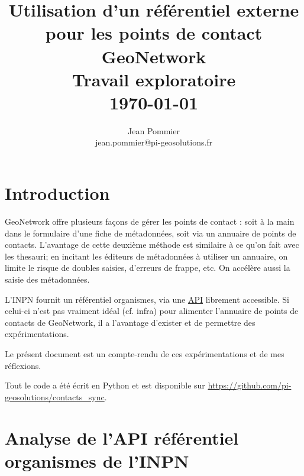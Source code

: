 \documentclass[11pt, a4paper, oneside]{book}
\newcommand{\gn}{GeoNetwork\xspace}
\begin{document}
\author{Jean Pommier \\ \small{jean.pommier@pi-geosolutions.fr}\vspace{2em}}
\title{Utilisation d'un référentiel externe \\ pour les points de contact GeoNetwork \\
\vspace{1em}
\large Travail exploratoire\\
\vspace{1em}
\large \today}
\date{}

\maketitle

\thispagestyle{fancy}

\vspace*{3cm}
\section*{Introduction}
\gn offre plusieurs façons de gérer les points de contact : soit à la main dans le formulaire d'une fiche de métadonnées, soit via un annuaire de points de contacts. L'avantage de cette deuxième méthode est similaire à ce qu'on fait avec les thesauri; en incitant les éditeurs de métadonnées à utiliser un annuaire, on limite le risque de doubles saisies, d'erreurs de frappe, etc. On accélère aussi la saisie des métadonnées.

L'INPN fournit un référentiel organismes, via une \href{https://odata-sinp.mnhn.fr/organizations}{API} librement accessible. Si celui-ci n'est pas vraiment idéal (cf. infra) pour alimenter l'annuaire de points de contacts de \gn, il a l'avantage d'exister et de permettre des expérimentations.

Le présent document est un compte-rendu de ces expérimentations et de mes réflexions.

Tout le code a été écrit en Python et est disponible sur \url{https://github.com/pi-geosolutions/contacts_sync}.

\section*{Analyse de l'API référentiel organismes de l'INPN}
\end{document}
